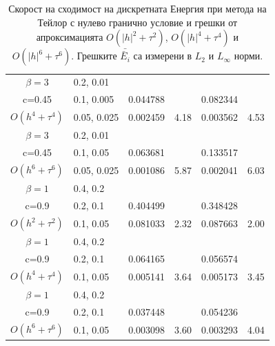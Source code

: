 \documentclass[a5paper]{article}
\theoremstyle{remark}
\begin{document}
\begin{large}
\begin{table}[ht]
\begin{small}
\begin{tabular}{||c|l|ll|ll||}
\hline 
  $\beta=3$               &0.2, 0.01       	&                	&          	&                     	&      \\
   c=0.45                   &0.1, 0.005      	&0.044788 	&         	&0.082344   		&       \\
 $O(h^4+ \tau^4)$ &0.05, 0.025  		&0.002459 	&4.18    	&0.003562   		&4.53      \\
\hline 
  $\beta=3$               &0.2, 0.01       	&                	&          	&                 	&            \\
     c=0.45                 &0.1, 0.05        	&0.063681 	&          	&  0.133517  	&           \\
 $O(h^6+ \tau^6)$ &0.05, 0.025 		&0.001086 	& 5.87   	&  0.002041		&6.03   \\
\hline
\hline 
       $\beta=1$       	&0.4, 0.2     		&             	&           &           		&   \\
                  c=0.9    	&0.2, 0.1     		& 0.404499 	&           &0.348428 		&   \\
$O(h^2+ \tau^2)$ 	&0.1, 0.05   		& 0.081033  	&2.32  	&0.087663  		& 2.00 \\
\hline
      $\beta=1$           &0.4, 0.2    		&            	&        	&             		&    \\
       c=0.9                	&0.2, 0.1     		& 0.064165  	&        	&  0.056574   	&   \\
$O(h^4+ \tau^4)$ 	&0.1, 0.05   		&0.005141 	& 3.64  	& 0.005173  		& 3.45  \\
\hline
  $\beta=1$     	 	&0.4, 0.2   		&            	&         	&                  	&      \\
      c=0.9                 	&0.2, 0.1   		&0.037448	&         	& 0.054236      	&       \\
   $O(h^6+ \tau^6)$ &0.1, 0.05  		& 0.003098 	& 3.60 	& 0.003293  		& 4.04        \\
\hline
\hline 
		\end{tabular}
		\caption{Скорост на сходимост на дискретната Енергия при метода на Тейлор с нулево гранично условие и грешки от апроксимацията $O(|h|^{2} + \tau^2 )$, $O(|h|^{4} + \tau^4 )$ и $O(|h|^{6} + \tau^6 )$. Грешките $\bar{\bar E_i}$ са измерени в $L_2$ и $L_\infty$ норми.}
\label{tableB}
\end{small}
\end{table}
\FloatBarrier


\end{large}
\end{document}
